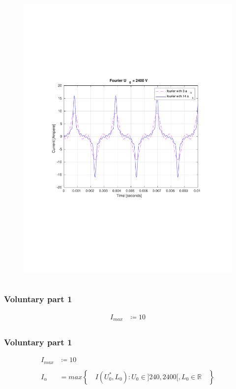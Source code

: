 \documentclass[aspectratio=1610]{beamer}
\begin{document}
\begin{frame}
\begin{columns}
\begin{figure}
				\includegraphics[scale=0.4]{figs/fourier comparison 2400.pdf}
			\end{figure}
	\end{columns}
\end{frame}
\begin{frame}
\frametitle{Voluntary part 1}
	\begin{align*}
		I_{max}&\coloneqq 10\\
	\end{align*}
\end{frame}
\begin{frame}
\frametitle{Voluntary part 1}
	\begin{align*}
		I_{max}&\coloneqq 10\\ \\
		I_{\alpha} &= max \left\lbrace \quad I(U^{*}_{0},L_{0}):U_{0}	\in]240,2400[,L_{0}\in \mathbb{R} \quad\right\rbrace\\ \\
	\end{align*}
\end{frame}
\end{document}

